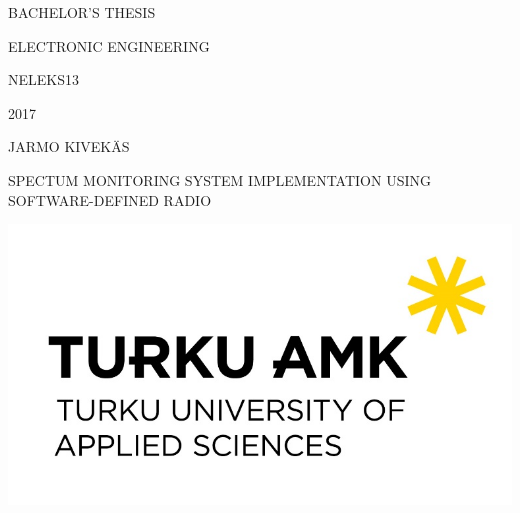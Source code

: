 
\begin{titlepage}
    BACHELOR'S THESIS

    ELECTRONIC ENGINEERING

    NELEKS13

    2017

    {
        \addtolength{\leftskip}{0.886in}
    	\vspace{5cm}
        JARMO KIVEKÄS\par
    	{\Huge SPECTUM MONITORING SYSTEM IMPLEMENTATION USING SOFTWARE-DEFINED RADIO\par}
    }
    \vfill
    {
        \centering
    	\includegraphics{img/tuas-logo}\par\vspace{1cm}
    }
\end{titlepage}
